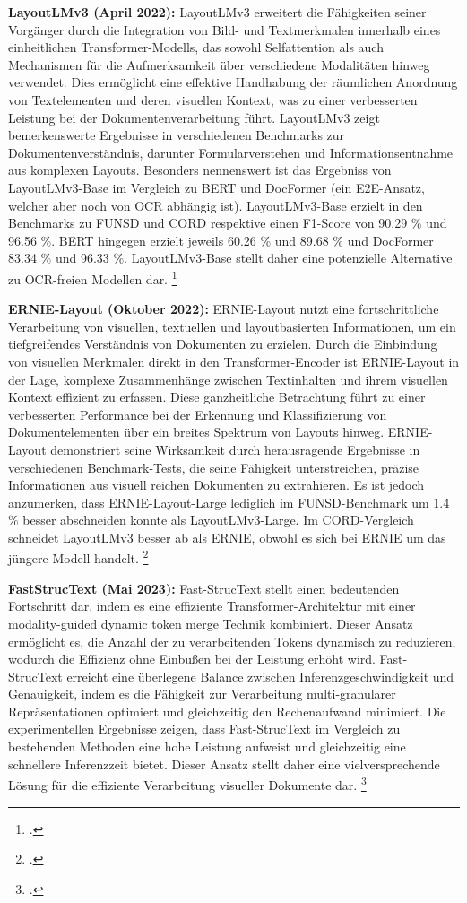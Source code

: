 \textbf{LayoutLMv3 (April 2022):} LayoutLMv3 erweitert die Fähigkeiten seiner Vorgänger durch die Integration von Bild- und Textmerkmalen innerhalb eines einheitlichen Transformer-Modells, das sowohl Selfattention als auch Mechanismen für die Aufmerksamkeit über verschiedene Modalitäten hinweg verwendet. Dies ermöglicht eine effektive Handhabung der räumlichen Anordnung von Textelementen und deren visuellen Kontext, was zu einer verbesserten Leistung bei der Dokumentenverarbeitung führt. LayoutLMv3 zeigt bemerkenswerte Ergebnisse in verschiedenen Benchmarks zur Dokumentenverständnis, darunter Formularverstehen und Informationsentnahme aus komplexen Layouts. Besonders nennenswert ist das Ergebniss von LayoutLMv3-Base im Vergleich zu BERT und DocFormer (ein E2E-Ansatz, welcher aber noch von OCR abhängig ist). LayoutLMv3-Base erzielt in den Benchmarks zu \ac{FUNSD} und \ac{CORD} respektive einen F1-Score von 90.29 \% und 96.56 \%. BERT hingegen erzielt jeweils 60.26 \% und 89.68 \% und DocFormer 83.34 \% und 96.33 \%. LayoutLMv3-Base stellt daher eine potenzielle Alternative zu OCR-freien Modellen dar. \footcites[Vgl. dazu ausführlich][S. 4087 ff.]{huang_layoutlmv3_2022}

\textbf{ERNIE-Layout (Oktober 2022):} ERNIE-Layout nutzt eine fortschrittliche Verarbeitung von visuellen, textuellen und layoutbasierten Informationen, um ein tiefgreifendes Verständnis von Dokumenten zu erzielen. Durch die Einbindung von visuellen Merkmalen direkt in den Transformer-Encoder ist ERNIE-Layout in der Lage, komplexe Zusammenhänge zwischen Textinhalten und ihrem visuellen Kontext effizient zu erfassen. Diese ganzheitliche Betrachtung führt zu einer verbesserten Performance bei der Erkennung und Klassifizierung von Dokumentelementen über ein breites Spektrum von Layouts hinweg. ERNIE-Layout demonstriert seine Wirksamkeit durch herausragende Ergebnisse in verschiedenen Benchmark-Tests, die seine Fähigkeit unterstreichen, präzise Informationen aus visuell reichen Dokumenten zu extrahieren. Es ist jedoch anzumerken, dass ERNIE-Layout-Large lediglich im FUNSD-Benchmark um 1.4 \% besser abschneiden konnte als LayoutLMv3-Large. Im CORD-Vergleich schneidet LayoutLMv3 besser ab als ERNIE, obwohl es sich bei ERNIE um das jüngere Modell handelt. \footcites[Vgl. dazu ausführlich][S. 7 f.]{peng_ernie-layout_2022}

\textbf{FastStrucText (Mai 2023):} Fast-StrucText stellt einen bedeutenden Fortschritt dar, indem es eine effiziente Transformer-Architektur mit einer modality-guided dynamic token merge Technik kombiniert. Dieser Ansatz ermöglicht es, die Anzahl der zu verarbeitenden Tokens dynamisch zu reduzieren, wodurch die Effizienz ohne Einbußen bei der Leistung erhöht wird. Fast-StrucText erreicht eine überlegene Balance zwischen Inferenzgeschwindigkeit und Genauigkeit, indem es die Fähigkeit zur Verarbeitung multi-granularer Repräsentationen optimiert und gleichzeitig den Rechenaufwand minimiert. Die experimentellen Ergebnisse zeigen, dass Fast-StrucText im Vergleich zu bestehenden Methoden eine hohe Leistung aufweist und gleichzeitig eine schnellere Inferenzzeit bietet. Dieser Ansatz stellt daher eine vielversprechende Lösung für die effiziente Verarbeitung visueller Dokumente dar. \footcites[Vgl. dazu ausführlich][]{zhai_fast-structext_2023}


